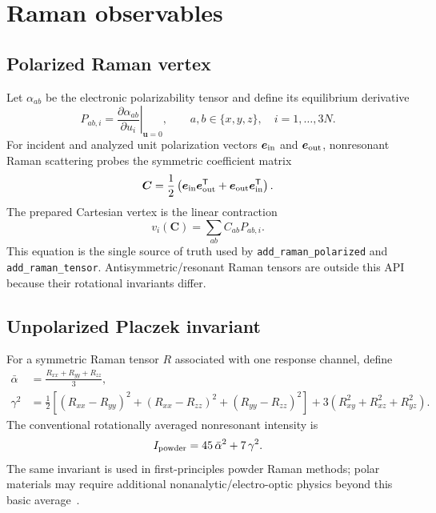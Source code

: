 \documentclass[11pt,a4paper]{article}
\begin{document}
\section{Raman observables}
\label{sec:raman}

\subsection{Polarized Raman vertex}

Let $\alpha_{ab}$ be the electronic polarizability tensor and define its
equilibrium derivative
\begin{equation}
  P_{ab,i}=\left.\frac{\partial\alpha_{ab}}{\partial u_i}\right|_{\bm u=0},
  \qquad a,b\in\{x,y,z\},\quad i=1,\ldots,3N.
  \label{eq:raman-derivative}
\end{equation}
For incident and analyzed unit polarization vectors $\bm e_{\rm in}$ and
$\bm e_{\rm out}$, nonresonant Raman scattering probes the symmetric
coefficient matrix
\begin{equation}
  \bm C=\frac12\left(
  \bm e_{\rm in}\bm e_{\rm out}^{\mathsf T}+
  \bm e_{\rm out}\bm e_{\rm in}^{\mathsf T}\right).
\end{equation}
The prepared Cartesian vertex is the linear contraction
\begin{equation}
  v_i(\bm C)=\sum_{ab}C_{ab}P_{ab,i}.
  \label{eq:raman-vertex}
\end{equation}
This equation is the single source of truth used by
\texttt{add\_raman\_polarized} and \texttt{add\_raman\_tensor}.
Antisymmetric/resonant Raman tensors are outside this API because their
rotational invariants differ.

\subsection{Unpolarized Placzek invariant}

For a symmetric Raman tensor $R$ associated with one response channel, define
\begin{align}
  \bar\alpha &= \frac{R_{xx}+R_{yy}+R_{zz}}{3},\\
  \gamma^2 &= \frac12\left[(R_{xx}-R_{yy})^2+
  (R_{xx}-R_{zz})^2+(R_{yy}-R_{zz})^2\right]
  +3\left(R_{xy}^2+R_{xz}^2+R_{yz}^2\right).
\end{align}
The conventional rotationally averaged nonresonant intensity is
\begin{equation}
  I_{\rm powder}=45\,\bar\alpha^2+7\,\gamma^2.
  \label{eq:placzek}
\end{equation}
The same invariant is used in first-principles powder Raman methods; polar
materials may require additional nonanalytic/electro-optic physics beyond
this basic average~\cite{popov2020}.
\end{document}

